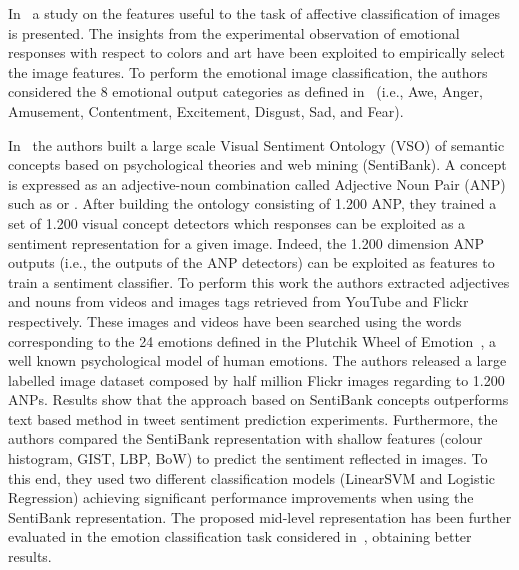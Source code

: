 In~\cite{machajdik2010affective} a study on the features useful to the task of affective classification of images is presented. The insights from the experimental observation of emotional responses with respect to colors and art have been exploited to empirically select the image features. 
To perform the emotional image classification, the authors considered the 8 emotional output categories as defined in~\cite{mikels2005emotional} (i.e., Awe,  Anger, Amusement, Contentment, Excitement, Disgust, Sad, and Fear). 


In~\cite{borth2013large} the authors built a large scale Visual Sentiment Ontology (VSO) of semantic concepts based on psychological theories and web mining (SentiBank). A concept is expressed as an adjective-noun combination called Adjective Noun Pair (ANP) such as  or . After building the ontology consisting of 1.200 ANP, they trained a set of 1.200 visual concept detectors which responses can be exploited as a sentiment representation for a given image. Indeed, the 1.200 dimension ANP outputs (i.e., the outputs of the ANP detectors) can be exploited as features to train a sentiment classifier. To perform this work the authors extracted adjectives and nouns from videos and images tags retrieved from YouTube and Flickr respectively. These images and videos have been searched using the words corresponding to the 24 emotions defined in the Plutchik Wheel of Emotion~\cite{plutchik1980general}, a well known psychological model of human emotions. The authors released a large labelled image dataset composed by half million Flickr images regarding to 1.200 ANPs. %
Results show that the approach based on SentiBank concepts outperforms text based method in tweet sentiment prediction experiments. %
Furthermore, the authors compared the SentiBank representation with shallow features (colour histogram, GIST, LBP, BoW) to predict the sentiment reflected in images. To this end, they used two different classification models (LinearSVM and Logistic Regression) achieving significant performance improvements when using the SentiBank representation.
The proposed mid-level representation has been further evaluated in the emotion classification task considered in~\cite{machajdik2010affective}, obtaining better results. %

